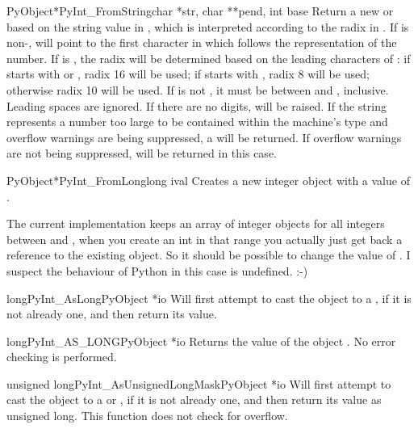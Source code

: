 \begin{cfuncdesc}{PyObject*}{PyInt_FromString}{char *str, char **pend,
                                               int base}
  Return a new  or  based on the
  string value in , which is interpreted according to the radix in
  .  If  is non-\NULL{},  will point to
  the first character in  which follows the representation of the
  number.  If  is , the radix will be determined based on
  the leading characters of : if  starts with 
  or , radix 16 will be used; if  starts with
  , radix 8 will be used; otherwise radix 10 will be used.  If
   is not , it must be between  and ,
  inclusive.  Leading spaces are ignored.  If there are no digits,
   will be raised.  If the string represents a number
  too large to be contained within the machine's  type and
  overflow warnings are being suppressed, a  will be
  returned.  If overflow warnings are not being suppressed, \NULL{} will be
  returned in this case.
\end{cfuncdesc}

\begin{cfuncdesc}{PyObject*}{PyInt_FromLong}{long ival}
  Creates a new integer object with a value of .

  The current implementation keeps an array of integer objects for all
  integers between  and , when you create an int in
  that range you actually just get back a reference to the existing
  object. So it should be possible to change the value of .  I
  suspect the behaviour of Python in this case is undefined. :-)
\end{cfuncdesc}

\begin{cfuncdesc}{long}{PyInt_AsLong}{PyObject *io}
  Will first attempt to cast the object to a , if
  it is not already one, and then return its value.
\end{cfuncdesc}

\begin{cfuncdesc}{long}{PyInt_AS_LONG}{PyObject *io}
  Returns the value of the object .  No error checking is
  performed.
\end{cfuncdesc}

\begin{cfuncdesc}{unsigned long}{PyInt_AsUnsignedLongMask}{PyObject *io}
  Will first attempt to cast the object to a  or
  , if it is not already one, and then return its
  value as unsigned long.  This function does not check for overflow.
\end{cfuncdesc}

